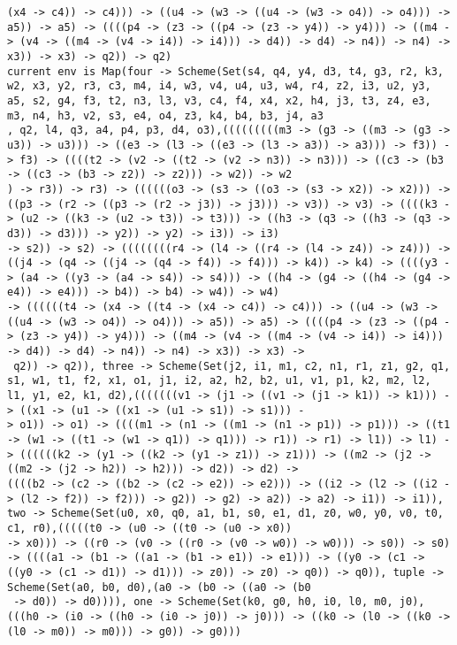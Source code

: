 \documentclass[11pt,oneside,a4paper]{report}
\begin{document}
\begin{lstlisting}[breaklines=true,caption={The output of an exponential type},label=lst:appedix:bigexp]
 (x4 -> c4)) -> c4))) -> ((u4 -> (w3 -> ((u4 -> (w3 -> o4)) -> o4))) -> a5)) -> a5) -> ((((p4 -> (z3 -> ((p4 -> (z3 -> y4)) -> y4))) -> ((m4 -> (v4 -> ((m4 -> (v4 -> i4)) -> i4))) -> d4)) -> d4) -> n4)) -> n4) -> x3)) -> x3) -> q2)) -> q2)
current env is Map(four -> Scheme(Set(s4, q4, y4, d3, t4, g3, r2, k3, w2, x3, y2, r3, c3, m4, i4, w3, v4, u4, u3, w4, r4, z2, i3, u2, y3, a5, s2, g4, f3, t2, n3, l3, v3, c4, f4, x4, x2, h4, j3, t3, z4, e3, m3, n4, h3, v2, s3, e4, o4, z3, k4, b4, b3, j4, a3
, q2, l4, q3, a4, p4, p3, d4, o3),(((((((((m3 -> (g3 -> ((m3 -> (g3 -> u3)) -> u3))) -> ((e3 -> (l3 -> ((e3 -> (l3 -> a3)) -> a3))) -> f3)) -> f3) -> ((((t2 -> (v2 -> ((t2 -> (v2 -> n3)) -> n3))) -> ((c3 -> (b3 -> ((c3 -> (b3 -> z2)) -> z2))) -> w2)) -> w2
) -> r3)) -> r3) -> ((((((o3 -> (s3 -> ((o3 -> (s3 -> x2)) -> x2))) -> ((p3 -> (r2 -> ((p3 -> (r2 -> j3)) -> j3))) -> v3)) -> v3) -> ((((k3 -> (u2 -> ((k3 -> (u2 -> t3)) -> t3))) -> ((h3 -> (q3 -> ((h3 -> (q3 -> d3)) -> d3))) -> y2)) -> y2) -> i3)) -> i3)
-> s2)) -> s2) -> ((((((((r4 -> (l4 -> ((r4 -> (l4 -> z4)) -> z4))) -> ((j4 -> (q4 -> ((j4 -> (q4 -> f4)) -> f4))) -> k4)) -> k4) -> ((((y3 -> (a4 -> ((y3 -> (a4 -> s4)) -> s4))) -> ((h4 -> (g4 -> ((h4 -> (g4 -> e4)) -> e4))) -> b4)) -> b4) -> w4)) -> w4)
-> ((((((t4 -> (x4 -> ((t4 -> (x4 -> c4)) -> c4))) -> ((u4 -> (w3 -> ((u4 -> (w3 -> o4)) -> o4))) -> a5)) -> a5) -> ((((p4 -> (z3 -> ((p4 -> (z3 -> y4)) -> y4))) -> ((m4 -> (v4 -> ((m4 -> (v4 -> i4)) -> i4))) -> d4)) -> d4) -> n4)) -> n4) -> x3)) -> x3) ->
 q2)) -> q2)), three -> Scheme(Set(j2, i1, m1, c2, n1, r1, z1, g2, q1, s1, w1, t1, f2, x1, o1, j1, i2, a2, h2, b2, u1, v1, p1, k2, m2, l2, l1, y1, e2, k1, d2),(((((((v1 -> (j1 -> ((v1 -> (j1 -> k1)) -> k1))) -> ((x1 -> (u1 -> ((x1 -> (u1 -> s1)) -> s1))) -
> o1)) -> o1) -> ((((m1 -> (n1 -> ((m1 -> (n1 -> p1)) -> p1))) -> ((t1 -> (w1 -> ((t1 -> (w1 -> q1)) -> q1))) -> r1)) -> r1) -> l1)) -> l1) -> ((((((k2 -> (y1 -> ((k2 -> (y1 -> z1)) -> z1))) -> ((m2 -> (j2 -> ((m2 -> (j2 -> h2)) -> h2))) -> d2)) -> d2) ->
((((b2 -> (c2 -> ((b2 -> (c2 -> e2)) -> e2))) -> ((i2 -> (l2 -> ((i2 -> (l2 -> f2)) -> f2))) -> g2)) -> g2) -> a2)) -> a2) -> i1)) -> i1)), two -> Scheme(Set(u0, x0, q0, a1, b1, s0, e1, d1, z0, w0, y0, v0, t0, c1, r0),(((((t0 -> (u0 -> ((t0 -> (u0 -> x0))
-> x0))) -> ((r0 -> (v0 -> ((r0 -> (v0 -> w0)) -> w0))) -> s0)) -> s0) -> ((((a1 -> (b1 -> ((a1 -> (b1 -> e1)) -> e1))) -> ((y0 -> (c1 -> ((y0 -> (c1 -> d1)) -> d1))) -> z0)) -> z0) -> q0)) -> q0)), tuple -> Scheme(Set(a0, b0, d0),(a0 -> (b0 -> ((a0 -> (b0
 -> d0)) -> d0)))), one -> Scheme(Set(k0, g0, h0, i0, l0, m0, j0),(((h0 -> (i0 -> ((h0 -> (i0 -> j0)) -> j0))) -> ((k0 -> (l0 -> ((k0 -> (l0 -> m0)) -> m0))) -> g0)) -> g0)))

\end{lstlisting}
\end{document}
